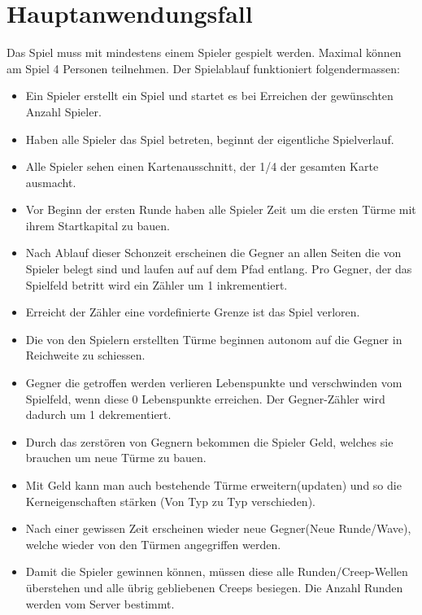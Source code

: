 \section{Hauptanwendungsfall}
Das Spiel muss mit mindestens einem Spieler gespielt werden. Maximal können am Spiel 4 Personen teilnehmen.
Der Spielablauf funktioniert folgendermassen:

\begin{itemize}
	\item Ein Spieler erstellt ein Spiel und startet es bei Erreichen der gewünschten Anzahl Spieler.
	\item Haben alle Spieler das Spiel betreten, beginnt der eigentliche Spielverlauf.
	\item Alle Spieler sehen einen Kartenausschnitt, der 1/4 der gesamten Karte ausmacht.
	\item Vor Beginn der ersten Runde haben alle Spieler Zeit um die ersten Türme mit ihrem Startkapital zu bauen.
	\item Nach Ablauf dieser Schonzeit erscheinen die Gegner an allen Seiten die von Spieler belegt sind und laufen auf auf dem Pfad entlang. Pro Gegner, der das Spielfeld betritt wird ein Zähler um 1 inkrementiert.
	\item Erreicht der Zähler eine vordefinierte Grenze ist das Spiel verloren.
	\item Die von den Spielern erstellten Türme beginnen autonom auf die Gegner in Reichweite zu schiessen.
	\item Gegner die getroffen werden verlieren Lebenspunkte und verschwinden vom Spielfeld, wenn diese 0 Lebenspunkte erreichen. Der Gegner-Zähler wird dadurch um 1 dekrementiert.
	\item Durch das zerstören von Gegnern bekommen die Spieler Geld, welches sie brauchen um neue Türme zu bauen.
	\item Mit Geld kann man auch bestehende Türme erweitern(updaten) und so die Kerneigenschaften stärken (Von Typ zu Typ verschieden).
	\item Nach einer gewissen Zeit erscheinen wieder neue Gegner(Neue Runde/Wave), welche wieder von den Türmen angegriffen werden.
	\item Damit die Spieler gewinnen können, müssen diese alle Runden/Creep-Wellen überstehen und alle übrig gebliebenen Creeps besiegen. Die Anzahl Runden werden vom Server bestimmt.
\end{itemize}
